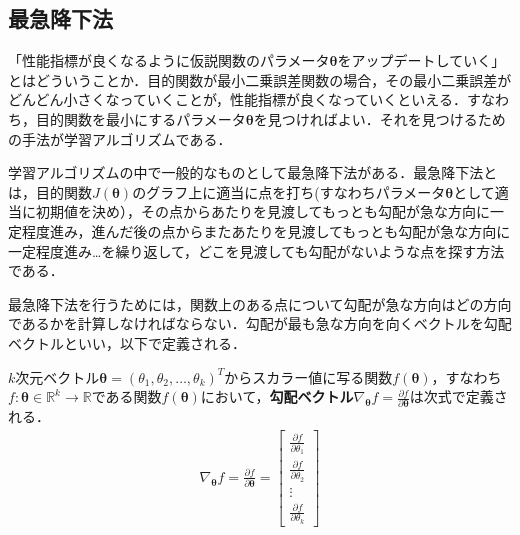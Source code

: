 \begin{cod}[\texttt{lrfig1.eps}作成プログラム(\texttt{lrfig1.py})]　
}]{code/lrfig1.py}
\end{cod}

\subsection{最急降下法}

「性能指標が良くなるように仮説関数のパラメータ${\bm \theta}$をアップデートしていく」とはどういうことか．目的関数が最小二乗誤差関数の場合，その最小二乗誤差がどんどん小さくなっていくことが，性能指標が良くなっていくといえる．すなわち，目的関数を最小にするパラメータ${\bm \theta}$を見つければよい．それを見つけるための手法が学習アルゴリズムである．

学習アルゴリズムの中で一般的なものとして最急降下法がある．最急降下法とは，目的関数$J({\bm \theta})$のグラフ上に適当に点を打ち(すなわちパラメータ${\bm \theta}$として適当に初期値を決め），その点からあたりを見渡してもっとも勾配が急な方向に一定程度進み，進んだ後の点からまたあたりを見渡してもっとも勾配が急な方向に一定程度進み\ldots を繰り返して，どこを見渡しても勾配がないような点を探す方法である．

最急降下法を行うためには，関数上のある点について勾配が急な方向はどの方向であるかを計算しなければならない．勾配が最も急な方向を向くベクトルを勾配ベクトルといい，以下で定義される．
\begin{defi}[勾配ベクトル]
$k$次元ベクトル${\bm \theta}=(\theta_1,\theta_2,\ldots,\theta_k)^T$からスカラー値に写る関数$f({\bm \theta})$，すなわち$f:{\bm \theta} \in \mathbb{R}^k \to \mathbb{R}$である関数$f({\bm \theta})$において，{\bf 勾配ベクトル}$\nabla_{{\bm \theta}}f=\frac{\partial f}{\partial {\bm \theta}}$は次式で定義される．
\begin{align}
\nabla_{{\bm \theta}}f = \frac{\partial f}{\partial {\bm \theta}} = 
\begin{bmatrix}
\frac{\partial f}{\partial \theta_1} \\[5pt]
\frac{\partial f}{\partial \theta_2} \\[3pt]
\vdots \\[5pt]
\frac{\partial f}{\partial \theta_k}
\end{bmatrix}
\end{align}
\end{defi}

